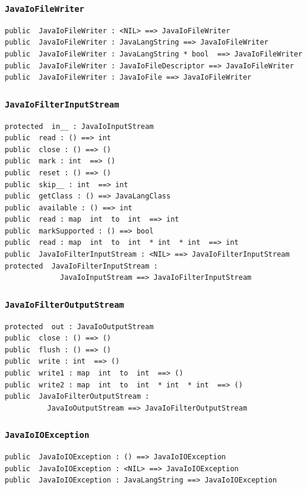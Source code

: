 \documentclass[\pformat,12pt]{article}
\begin{document}
\subsubsection{\texttt{JavaIoFileWriter}}
\begin{small}
\begin{verbatim}
public  JavaIoFileWriter : <NIL> ==> JavaIoFileWriter
public  JavaIoFileWriter : JavaLangString ==> JavaIoFileWriter
public  JavaIoFileWriter : JavaLangString * bool  ==> JavaIoFileWriter
public  JavaIoFileWriter : JavaIoFileDescriptor ==> JavaIoFileWriter
public  JavaIoFileWriter : JavaIoFile ==> JavaIoFileWriter
\end{verbatim}
\end{small}

\subsubsection{\texttt{JavaIoFilterInputStream}}
\begin{small}
\begin{verbatim}
protected  in__ : JavaIoInputStream
public  read : () ==> int
public  close : () ==> ()
public  mark : int  ==> ()
public  reset : () ==> ()
public  skip__ : int  ==> int
public  getClass : () ==> JavaLangClass
public  available : () ==> int
public  read : map  int  to  int  ==> int
public  markSupported : () ==> bool
public  read : map  int  to  int  * int  * int  ==> int
public  JavaIoFilterInputStream : <NIL> ==> JavaIoFilterInputStream
protected  JavaIoFilterInputStream : 
             JavaIoInputStream ==> JavaIoFilterInputStream
\end{verbatim}
\end{small}

\subsubsection{\texttt{JavaIoFilterOutputStream}}
\begin{small}
\begin{verbatim}
protected  out : JavaIoOutputStream
public  close : () ==> ()
public  flush : () ==> ()
public  write : int  ==> ()
public  write1 : map  int  to  int  ==> ()
public  write2 : map  int  to  int  * int  * int  ==> ()
public  JavaIoFilterOutputStream : 
          JavaIoOutputStream ==> JavaIoFilterOutputStream
\end{verbatim}
\end{small}

\subsubsection{\texttt{JavaIoIOException}}
\begin{small}
\begin{verbatim}
public  JavaIoIOException : () ==> JavaIoIOException
public  JavaIoIOException : <NIL> ==> JavaIoIOException
public  JavaIoIOException : JavaLangString ==> JavaIoIOException
\end{verbatim}
\end{small}
\end{document}
